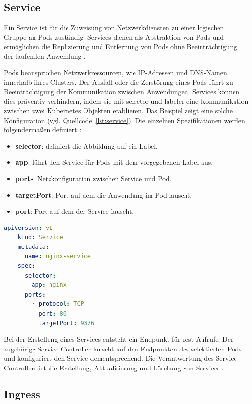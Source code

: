 \subsection{Service}
Ein Service ist für die Zuweisung von Netzwerkdiensten zu einer logischen Gruppe an Pods zuständig.
Services dienen als Abstraktion von Pods und ermöglichen die Replizierung und Entfernung
von Pods ohne Beeinträchtigung der laufenden Anwendung \cite{kubernetesservice}.

Pods beanspruchen Netzwerkressourcen, wie IP-Adressen und DNS-Namen 
innerhalb ihres Clusters. Der Ausfall oder die Zerstörung eines Pods führt zu Beeinträchtigung der Kommunikation
zwischen Anwendungen. Services können dies präventiv verhindern, indem sie mit
selector und labeler eine Kommunikation zwischen zwei Kubernetes Objekten etablieren.
Das Beispiel zeigt eine solche Konfiguration (vgl. Quellcode~\ref{lst:service}). 
Die einzelnen Spezifikationen werden folgendermaßen definiert \cite{kubernetesservice}:

\begin{itemize}
  \item \textbf{selector}: definiert die Abbildung auf ein Label.
  \item \textbf{app}: führt den Service für Pods mit dem vorgegebenen Label aus.
  \item \textbf{ports}: Netzkonfiguration zwischen Service und Pod.
  \item \textbf{targetPort}: Port auf dem die Anwendung im Pod lauscht.
  \item \textbf{port}: Port auf dem der Service lauscht.
\end{itemize}

\begin{lstlisting}[caption={service.yaml \cite{kubernetesservice} },captionpos=b,label={lst:service},language=yaml]
    apiVersion: v1
    kind: Service
    metadata:
      name: nginx-service
    spec:
      selector:
        app: nginx
      ports:
        - protocol: TCP
          port: 80
          targetPort: 9376
\end{lstlisting}


Bei der Erstellung eines Services entsteht ein Endpunkt für \acs{rest}-Aufrufe. 
Der zugehörige Service-Controller lauscht auf den Endpunkten des selektierten Pods und konfiguriert den Service dementsprechend. 
Die Verantwortung des Service-Controllers ist die Erstellung, Aktualisierung und Löschung von Services \cite{kubernetesservice}. 

\subsection{Ingress} \label{nginx-ingress}

